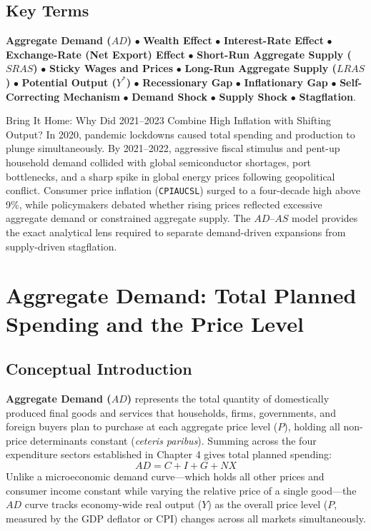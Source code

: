\documentclass[11pt,letterpaper]{article}
\begin{document}
\subsection*{Key Terms}
\textbf{Aggregate Demand ($AD$)} $\bullet$ \textbf{Wealth Effect} $\bullet$ \textbf{Interest-Rate Effect} $\bullet$ \textbf{Exchange-Rate (Net Export) Effect} $\bullet$ \textbf{Short-Run Aggregate Supply ($SRAS$)} $\bullet$ \textbf{Sticky Wages and Prices} $\bullet$ \textbf{Long-Run Aggregate Supply ($LRAS$)} $\bullet$ \textbf{Potential Output ($Y^*$)} $\bullet$ \textbf{Recessionary Gap} $\bullet$ \textbf{Inflationary Gap} $\bullet$ \textbf{Self-Correcting Mechanism} $\bullet$ \textbf{Demand Shock} $\bullet$ \textbf{Supply Shock} $\bullet$ \textbf{Stagflation}.

\begin{examplecase}{Bring It Home: Why Did 2021--2023 Combine High Inflation with Shifting Output?}
In 2020, pandemic lockdowns caused total spending and production to plunge simultaneously. By 2021--2022, aggressive fiscal stimulus and pent-up household demand collided with global semiconductor shortages, port bottlenecks, and a sharp spike in global energy prices following geopolitical conflict. Consumer price inflation (\texttt{CPIAUCSL}) surged to a four-decade high above 9\%, while policymakers debated whether rising prices reflected excessive aggregate demand or constrained aggregate supply. The $AD\text{--}AS$ model provides the exact analytical lens required to separate demand-driven expansions from supply-driven stagflation.
\end{examplecase}

\section{Aggregate Demand: Total Planned Spending and the Price Level}

\subsection*{Conceptual Introduction}
\textbf{Aggregate Demand ($AD$)} represents the total quantity of domestically produced final goods and services that households, firms, governments, and foreign buyers plan to purchase at each aggregate price level ($P$), holding all non-price determinants constant (\textit{ceteris paribus}). Summing across the four expenditure sectors established in Chapter 4 gives total planned spending:
\[
AD = C + I + G + NX
\]
Unlike a microeconomic demand curve—which holds all other prices and consumer income constant while varying the relative price of a single good—the $AD$ curve tracks economy-wide real output ($Y$) as the overall price level ($P$, measured by the GDP deflator or CPI) changes across all markets simultaneously.
\end{document}
